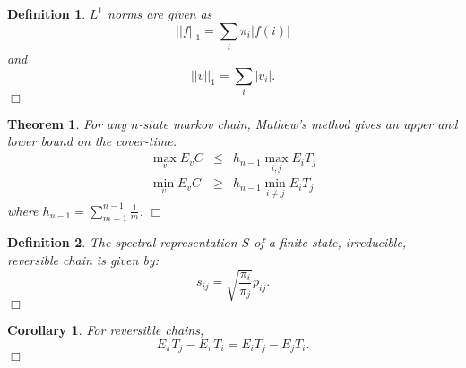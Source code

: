 \documentclass[11pt, letterpaper]{article}
\newenvironment{definition}
{\noindent\begin{defn}}
{\hfill $\Box$ \end{defn}}
\newtheorem{defn}{Definition}
\newenvironment{theorem}
{\noindent\begin{thm}}
{\hfill $\Box$ \end{thm}}
\newtheorem{thm}{Theorem}
\newenvironment{corollary}
{\noindent\begin{cor}}
{\hfill $\Box$ \end{cor}}
\newtheorem{cor}{Corollary}
\begin{document}
\begin{definition}
$L^1$ norms are given as
\[
	||f||_1 = \sum_i \pi_i |f(i)|
\]
and
\[
	||v||_1 = \sum_i |v_i|.
\]
\end{definition}

\begin{theorem}
For any $n$-state markov chain, Mathew's method gives an upper and lower bound on the cover-time.
\begin{eqnarray*}
	\max_v E_v C & \le & h_{n-1} \max_{i,j} E_i T_j \\
	\min_v E_v C & \ge & h_{n-1} \min_{i \ne j} E_i T_j
\end{eqnarray*}
where $h_{n-1} = \sum_{m=1}^{n-1} \frac{1}{m}$.
\end{theorem}


\begin{definition}
The spectral representation $S$ of a finite-state, irreducible, reversible chain is given by:
\[
	s_{ij} = \sqrt{\frac{\pi_i}{\pi_j}}  p_{ij}.
\]
\end{definition}

\begin{corollary}
For reversible chains,
\[
	E_\pi T_j - E_\pi T_i = E_i T_j - E_j T_i.
\]
\end{corollary}
\end{document}
